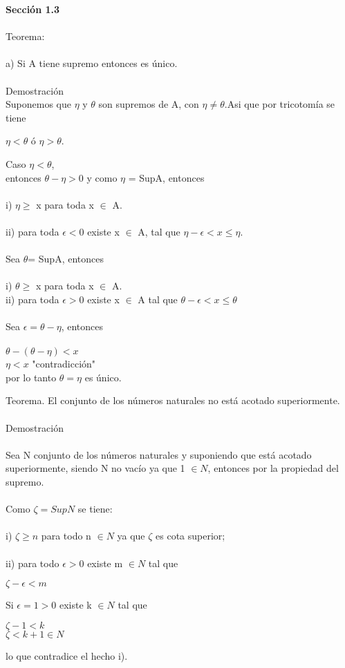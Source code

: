 \documentclass[12pt,a4paper,scrartcl]{article}
\begin{document}
{%
\newpage
\textbf{Secci\'on 1.3}\\
\\Teorema:\\
\\a) Si A tiene supremo entonces es \'unico.\\
\\Demostraci\'on\\
Suponemos que $\eta$ y $\theta$ son supremos de A, con	 $\eta  \neq  \theta $.\hspace{1em}Asi que por tricotom\'ia se tiene\\
\begin{center}
$\eta<\theta$ \'o $\eta>\theta$.
\end{center}
Caso $\eta < \theta$,\\entonces $\theta-\eta>0$ y como $\eta$ = SupA, entonces\\
\\i) $\eta \geq$ x para toda x $\in$ A.\\
\\ii) para toda $\epsilon < 0$ existe x $\in$ A,  tal que $\eta-\epsilon<x\leq\eta$. \\
\\Sea $\theta$= SupA, entonces\\
\\
i) $\theta\geq$ x para toda x $\in$ A.\\
ii) para toda $\epsilon > 0$ existe x $\in$ A tal que $\theta-\epsilon<x\leq\theta$\\
\\Sea $\epsilon=\theta-\eta$, entonces \\
\\
$\theta-(\theta-\eta)<x$\\
$\eta<x$ "contradicci\'on"\\
por lo tanto $\theta=\eta $ es \'unico.

\newpage
Teorema. El conjunto de los n\'umeros naturales no est\'a acotado superiormente.\\
\\Demostraci\'on\\
\\Sea N conjunto de los n\'umeros naturales y suponiendo que est\'a acotado superiormente, siendo N no vac\'io ya que 1 $\in N$, entonces por la propiedad del supremo.\\
\\Como $\zeta = SupN$ se tiene:\\
\\i) $\zeta\geq n$ para todo n $\in N$ ya que $\zeta$ es cota superior;\\
\\ii) para todo $\epsilon>0$ existe m $\in N$ tal que 
\begin{center}
$ \zeta-\epsilon<m$
\end{center}
Si $\epsilon=1>0$ existe k $\in N$ tal que\\
\begin{center}
$\zeta-1<k$\\
$\zeta<k+1 \in N$
\end{center}
lo que contradice el hecho i).

}
\end{document}
